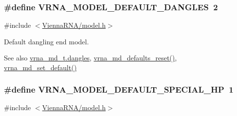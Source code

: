 \subsubsection[{\texorpdfstring{V\+R\+N\+A\+\_\+\+M\+O\+D\+E\+L\+\_\+\+D\+E\+F\+A\+U\+L\+T\+\_\+\+D\+A\+N\+G\+L\+ES}{VRNA_MODEL_DEFAULT_DANGLES}}]{\setlength{\rightskip}{0pt plus 5cm}\#define V\+R\+N\+A\+\_\+\+M\+O\+D\+E\+L\+\_\+\+D\+E\+F\+A\+U\+L\+T\+\_\+\+D\+A\+N\+G\+L\+ES~2}\hypertarget{group__model__details_ga2aa7bc2cae774b83a5c468f824c27a42}{}\label{group__model__details_ga2aa7bc2cae774b83a5c468f824c27a42}


{\ttfamily \#include $<$\hyperlink{model_8h}{Vienna\+R\+N\+A/model.\+h}$>$}



Default dangling end model. 

\begin{DoxySeeAlso}{See also}
\hyperlink{structvrna__md__s_adcda4ff2ea77748ae0e8700288282efc}{vrna\+\_\+md\+\_\+t.\+dangles}, \hyperlink{group__model__details_ga70834424cf804d149937de89f80ceb45}{vrna\+\_\+md\+\_\+defaults\+\_\+reset()}, \hyperlink{group__model__details_ga8ac6ff84936282436f822644bf841f66}{vrna\+\_\+md\+\_\+set\+\_\+default()} 
\end{DoxySeeAlso}
\subsubsection[{\texorpdfstring{V\+R\+N\+A\+\_\+\+M\+O\+D\+E\+L\+\_\+\+D\+E\+F\+A\+U\+L\+T\+\_\+\+S\+P\+E\+C\+I\+A\+L\+\_\+\+HP}{VRNA_MODEL_DEFAULT_SPECIAL_HP}}]{\setlength{\rightskip}{0pt plus 5cm}\#define V\+R\+N\+A\+\_\+\+M\+O\+D\+E\+L\+\_\+\+D\+E\+F\+A\+U\+L\+T\+\_\+\+S\+P\+E\+C\+I\+A\+L\+\_\+\+HP~1}\hypertarget{group__model__details_gabd1ab224e1048defd45c165ed7d1c108}{}\label{group__model__details_gabd1ab224e1048defd45c165ed7d1c108}


{\ttfamily \#include $<$\hyperlink{model_8h}{Vienna\+R\+N\+A/model.\+h}$>$}



